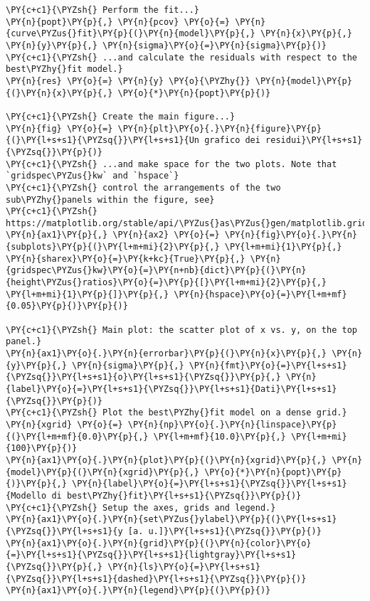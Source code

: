 \begin{Verbatim}[label=\makebox{\href{https://github.com/unipi-physics-labs/statnotes/tree/main/snippy/residual_plot.py}{https://github.com/.../residual\_plot.py}},commandchars=\\\{\}]
\PY{c+c1}{\PYZsh{} Perform the fit...}
\PY{n}{popt}\PY{p}{,} \PY{n}{pcov} \PY{o}{=} \PY{n}{curve\PYZus{}fit}\PY{p}{(}\PY{n}{model}\PY{p}{,} \PY{n}{x}\PY{p}{,} \PY{n}{y}\PY{p}{,} \PY{n}{sigma}\PY{o}{=}\PY{n}{sigma}\PY{p}{)}
\PY{c+c1}{\PYZsh{} ...and calculate the residuals with respect to the best\PYZhy{}fit model.}
\PY{n}{res} \PY{o}{=} \PY{n}{y} \PY{o}{\PYZhy{}} \PY{n}{model}\PY{p}{(}\PY{n}{x}\PY{p}{,} \PY{o}{*}\PY{n}{popt}\PY{p}{)}

\PY{c+c1}{\PYZsh{} Create the main figure...}
\PY{n}{fig} \PY{o}{=} \PY{n}{plt}\PY{o}{.}\PY{n}{figure}\PY{p}{(}\PY{l+s+s1}{\PYZsq{}}\PY{l+s+s1}{Un grafico dei residui}\PY{l+s+s1}{\PYZsq{}}\PY{p}{)}
\PY{c+c1}{\PYZsh{} ...and make space for the two plots. Note that `gridspec\PYZus{}kw` and `hspace`}
\PY{c+c1}{\PYZsh{} control the arrangements of the two sub\PYZhy{}panels within the figure, see}
\PY{c+c1}{\PYZsh{} https://matplotlib.org/stable/api/\PYZus{}as\PYZus{}gen/matplotlib.gridspec.GridSpec.html}
\PY{n}{ax1}\PY{p}{,} \PY{n}{ax2} \PY{o}{=} \PY{n}{fig}\PY{o}{.}\PY{n}{subplots}\PY{p}{(}\PY{l+m+mi}{2}\PY{p}{,} \PY{l+m+mi}{1}\PY{p}{,} \PY{n}{sharex}\PY{o}{=}\PY{k+kc}{True}\PY{p}{,} \PY{n}{gridspec\PYZus{}kw}\PY{o}{=}\PY{n+nb}{dict}\PY{p}{(}\PY{n}{height\PYZus{}ratios}\PY{o}{=}\PY{p}{[}\PY{l+m+mi}{2}\PY{p}{,} \PY{l+m+mi}{1}\PY{p}{]}\PY{p}{,} \PY{n}{hspace}\PY{o}{=}\PY{l+m+mf}{0.05}\PY{p}{)}\PY{p}{)}

\PY{c+c1}{\PYZsh{} Main plot: the scatter plot of x vs. y, on the top panel.}
\PY{n}{ax1}\PY{o}{.}\PY{n}{errorbar}\PY{p}{(}\PY{n}{x}\PY{p}{,} \PY{n}{y}\PY{p}{,} \PY{n}{sigma}\PY{p}{,} \PY{n}{fmt}\PY{o}{=}\PY{l+s+s1}{\PYZsq{}}\PY{l+s+s1}{o}\PY{l+s+s1}{\PYZsq{}}\PY{p}{,} \PY{n}{label}\PY{o}{=}\PY{l+s+s1}{\PYZsq{}}\PY{l+s+s1}{Dati}\PY{l+s+s1}{\PYZsq{}}\PY{p}{)}
\PY{c+c1}{\PYZsh{} Plot the best\PYZhy{}fit model on a dense grid.}
\PY{n}{xgrid} \PY{o}{=} \PY{n}{np}\PY{o}{.}\PY{n}{linspace}\PY{p}{(}\PY{l+m+mf}{0.0}\PY{p}{,} \PY{l+m+mf}{10.0}\PY{p}{,} \PY{l+m+mi}{100}\PY{p}{)}
\PY{n}{ax1}\PY{o}{.}\PY{n}{plot}\PY{p}{(}\PY{n}{xgrid}\PY{p}{,} \PY{n}{model}\PY{p}{(}\PY{n}{xgrid}\PY{p}{,} \PY{o}{*}\PY{n}{popt}\PY{p}{)}\PY{p}{,} \PY{n}{label}\PY{o}{=}\PY{l+s+s1}{\PYZsq{}}\PY{l+s+s1}{Modello di best\PYZhy{}fit}\PY{l+s+s1}{\PYZsq{}}\PY{p}{)}
\PY{c+c1}{\PYZsh{} Setup the axes, grids and legend.}
\PY{n}{ax1}\PY{o}{.}\PY{n}{set\PYZus{}ylabel}\PY{p}{(}\PY{l+s+s1}{\PYZsq{}}\PY{l+s+s1}{y [a. u.]}\PY{l+s+s1}{\PYZsq{}}\PY{p}{)}
\PY{n}{ax1}\PY{o}{.}\PY{n}{grid}\PY{p}{(}\PY{n}{color}\PY{o}{=}\PY{l+s+s1}{\PYZsq{}}\PY{l+s+s1}{lightgray}\PY{l+s+s1}{\PYZsq{}}\PY{p}{,} \PY{n}{ls}\PY{o}{=}\PY{l+s+s1}{\PYZsq{}}\PY{l+s+s1}{dashed}\PY{l+s+s1}{\PYZsq{}}\PY{p}{)}
\PY{n}{ax1}\PY{o}{.}\PY{n}{legend}\PY{p}{(}\PY{p}{)}


\end{Verbatim}
